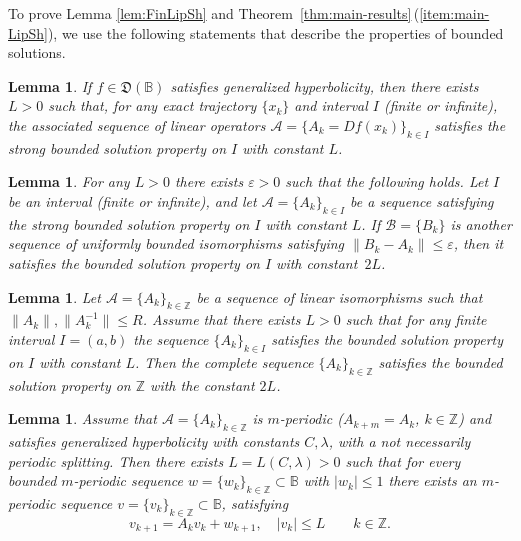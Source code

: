 \documentclass[12pt]{article}
\newcommand{\Bb}{\mathbb{B}}
\newcommand{\Zz}{\mathbb{Z}}
\newcommand{\DUC}{\mathfrak{D}}
\newtheorem{lem}[thm]{Lemma}
\theoremstyle{definition}
\begin{document}
To prove Lemma \ref{lem:FinLipSh} and Theorem~\ref{thm:main-results}\,(\ref{item:main-LipSh}), we use the following statements that describe the properties of bounded solutions.

\begin{lem}\label{lem:SBS}
If $f \in \DUC(\Bb)$ satisfies generalized hyperbolicity, then there exists $L>0$ such that, for any exact trajectory $\{x_k\}$ and interval $I$ (finite or infinite), the associated sequence of linear operators $\mathcal{A} = \{A_k = Df(x_k)\}_{k \in I}$ satisfies the strong bounded solution property on $I$ with constant $L$. 
\end{lem}

\begin{lem}\label{lem:SBS-robust}
For any $L > 0$ there exists $\varepsilon > 0$ such that the following holds. Let $I$ be an interval (finite or infinite), and let $\mathcal{A} = \{A_k\}_{k \in I}$ be a sequence satisfying the strong bounded solution property on $I$ with constant $L$. If $\mathcal{B} = \{B_k\}$ is another sequence of uniformly bounded isomorphisms satisfying 
$\|B_k - A_k\| \leq \varepsilon$,
then it satisfies the bounded solution property on $I$ with constant~$2L$.
\end{lem}

\begin{lem}\label{lem:Bk-Inf}
    Let $\mathcal A=\{A_k\}_{k\in\Zz}$ be a sequence of linear isomorphisms such that $\|A_k\|,\|A_k^{-1}\|\leq R$.
 Assume that there exists $L>0$ such that for any finite interval $I = (a, b)$ the sequence $\{A_k\}_{k \in I}$ satisfies the bounded solution property on $I$ with constant $L$. Then the complete sequence $\{A_k\}_{k \in \Zz}$ satisfies the bounded solution property on $\Zz$ with the constant $2L$.
\end{lem}


\begin{lem}\label{lem:SBS-periodic}
Assume that $\mathcal{A} = \{A_k\}_{k \in \Zz}$ is $m$-periodic ($A_{k+m}=A_k$, $k \in \Zz$) and satisfies generalized hyperbolicity with constants $C, \lambda$, with a not necessarily periodic splitting. Then there exists $L = L(C, \lambda)>0$ such that for every bounded $m$-periodic sequence 
$w=\{w_k\}_{k\in\mathbb{Z}}\subset\mathbb{B}$ with $|w_k| \leq 1$ there exists an $m$-periodic sequence $v=\{v_k\}_{k\in\mathbb{Z}}\subset\mathbb{B}$, satisfying 
\begin{equation}\label{eq:inhom-diff}
v_{k+1}=A_k v_k + w_{k+1}, \quad |v_k| \leq L \qquad k\in\mathbb{Z}.
\end{equation}
\end{lem}
\end{document}
